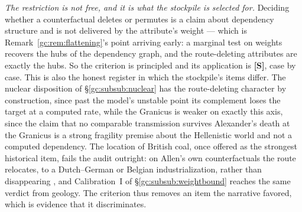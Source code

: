 \begin{remark}
\emph{The restriction is not free, and it is what the stockpile is
selected for.} Deciding whether a counterfactual deletes or permutes
is a claim about dependency structure and is not delivered by the
attribute's weight --- which is
Remark~\ref{gc:rem:flattening}'s point arriving early: a marginal test
on weights recovers the hubs of the dependency graph, and the
route-deleting attributes are exactly the hubs. So the criterion is
principled and its application is \textbf{[S]}, case by case. This is
also the honest register in which the stockpile's items differ. The
nuclear disposition of \S\ref{gc:subsub:nuclear} has the route-deleting
character by construction, since past the model's unstable point its
complement loses the target at a computed rate, while the Granicus is
weaker on exactly this axis, since the claim that no comparable
transmission survives Alexander's death at the Granicus is a strong
fragility premise about the Hellenistic world and not a computed
dependency. The location of British coal, once offered as the strongest
historical item, fails the audit outright: on Allen's own
counterfactuals the route relocates, to a Dutch--German or Belgian
industrialization, rather than disappearing \cite{Allen09}, and
Calibration~I of \S\ref{gc:subsub:weightbound} reaches the same verdict
from geology. The criterion thus removes an item the narrative favored,
which is evidence that it discriminates.
\end{remark}

